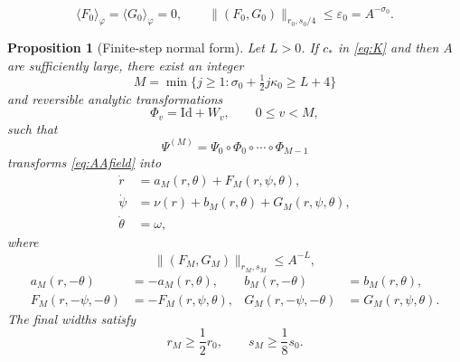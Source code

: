 \documentclass[10pt,a4paper]{amsart}
\newtheorem{proposition}{Proposition}
\newcommand{\Id}{\mathrm{Id}}
\newcommand{\av}[1]{\langle #1\rangle}
\newcommand{\eps}{\varepsilon}
\newcommand{\norm}[1]{\lVert #1\rVert}
\begin{document}
\begin{equation}\label{eq:epsilon0}
 \av{F_0}_{\varphi}=\av{G_0}_{\varphi}=0,\qquad
 \norm{(F_0,G_0)}_{r_0,s_0/4}\leq
 \eps_0=A^{-\sigma_0}.
\end{equation}

\begin{proposition}[Finite-step normal form]\label{prop:nf}
Let $L>0$.  If $c_*$ in \eqref{eq:K} and then $A$ are sufficiently large,
there exist an integer
\begin{equation}\label{eq:Mchoice}
 M=\min\{j\geq1:\sigma_0+\tfrac12j\kappa_0\geq L+4\}
\end{equation}
and reversible analytic transformations
\[
 \Phi_v=\Id+W_v,\qquad 0\leq v<M,
\]
such that
\[
 \Psi^{(M)}=\Psi_0\circ\Phi_0\circ\cdots\circ\Phi_{M-1}
\]
transforms \eqref{eq:AAfield} into
\begin{equation}\label{eq:NFfinal}
 \begin{aligned}
 \dot r&=a_M(r,\theta)+F_M(r,\psi,\theta),\\
 \dot\psi&=\nu(r)+b_M(r,\theta)+G_M(r,\psi,\theta),\\
 \dot\theta&=\omega,
 \end{aligned}
\end{equation}
where
\begin{equation}\label{eq:finalsmall}
 \norm{(F_M,G_M)}_{r_M,s_M}\leq A^{-L},
\end{equation}
\begin{equation}\label{eq:finalparity}
 \begin{aligned}
 a_M(r,-\theta)&=-a_M(r,\theta),&
 b_M(r,-\theta)&= b_M(r,\theta),\\
 F_M(r,-\psi,-\theta)&=-F_M(r,\psi,\theta),&
 G_M(r,-\psi,-\theta)&= G_M(r,\psi,\theta).
 \end{aligned}
\end{equation}
The final widths satisfy
\[
 r_M\geq\frac12r_0,\qquad s_M\geq\frac18s_0.
\]
\end{proposition}
\end{document}
